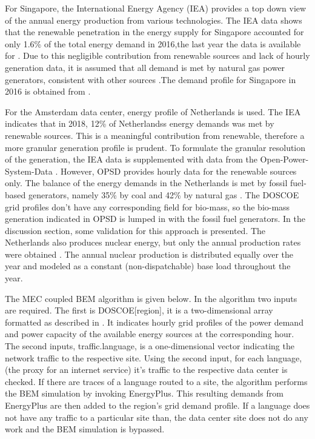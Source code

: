 \documentclass[twocolumn, a4paper,10pt]{article}
\begin{document}
  For Singapore, the International Energy Agency (IEA) provides a top down view of the annual energy production from various technologies. The IEA data shows that the renewable penetration in the energy supply for Singapore accounted for only 1.6\% of the total energy demand in 2016,the last year the data is available for \citep{IEA17}. Due to this negligible contribution from renewable sources and lack of hourly generation data, it is assumed that all demand is met by natural gas power generators, consistent with other sources \citep{eia20}.The demand profile for Singapore in 2016 is obtained from \citep{sin16}.

  For the Amsterdam data center, energy profile of Netherlands is used. The IEA indicates that in 2018, 12\% of Netherlands\textsc{}s energy demands was met by renewable sources. This is a meaningful contribution from renewable, therefore a more granular generation profile is prudent.  To formulate the granular resolution of the generation, the IEA data is supplemented with data from the Open-Power-System-Data \citep{ospd19}. However, OPSD provides hourly data for the renewable sources only. The balance of the energy demands in the Netherlands is met by fossil fuel-based generators, namely 35\% by coal and 42\% by natural gas \citep{eia20b}. The DOSCOE grid profiles don’t have any corresponding field for bio-mass, so the bio-mass generation indicated in OPSD is lumped in with the fossil fuel generators. In the discussion section, some validation for this approach is presented. The Netherlands also produces nuclear energy, but only the annual production rates were obtained \citep{eia20b}. The annual nuclear production is distributed equally over the year and modeled as a constant (non-dispatchable) base load throughout the year.  

  The MEC coupled BEM algorithm is given below. In the algorithm two inputs are required. The first is DOSCOE[region], it is a two-dimensional array formatted as described in \citep{platt17}. It indicates hourly grid profiles of the power demand and power capacity of the available energy sources at the corresponding hour. The second inputs, traffic.language, is a one-dimensional vector indicating the network traffic to the respective site. Using the second input, for each language, (the proxy for an internet service) it’s traffic to the respective data center is checked. If there are traces of a language routed to a site, the algorithm performs the BEM simulation by invoking EnergyPlus. This resulting demands from EnergyPlus are then added to the region’s grid demand profile. If a language does not have any traffic to a particular site than, the data center site does not do any work and the BEM simulation is bypassed.  
\end{document}
